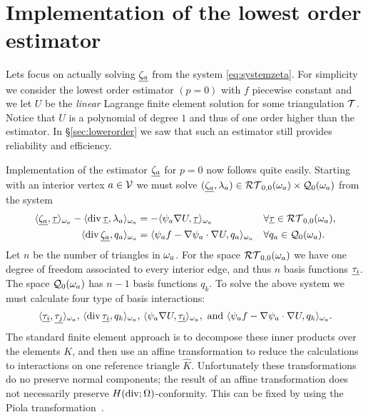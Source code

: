 \documentclass[thesis.tex]{subfiles}
\begin{document}
\section{Implementation of the lowest order estimator}
Lets focus on actually solving $\underline{\zeta_a}$ from the system \eqref{eq:systemzeta}. 
For simplicity we consider the lowest order estimator $(p=0)$ with $f$ piecewise constant and 
we let $U$ be the \emph{linear} Lagrange finite element solution for some triangulation $\mathcal{T}$. 
Notice that $U$ is a polynomial of degree $1$ and thus of one order higher than the estimator.
In \S\ref{sec:lowerorder} we saw that such an estimator still provides reliability and efficiency.


Implementation of the estimator $\underline{\zeta_a}$ for $p=0$ now follows quite easily. 
Starting with an interior vertex $a \in \mathcal{V}$ we must solve $(\underline{\zeta_a}, \lambda_a) \in \mathcal{RT}_{0,0}(\omega_a)\times \mathcal{Q}_0(\omega_a)$ from the system
\begin{equation}
  \label{eq:systemp0}
  \begin{alignedat}{3}
    \langle \underline{\zeta_a}, \underline{\tau} \rangle_{\omega_a} - \langle \operatorname{div} \underline{\tau}, {\lambda_a} \rangle_{\omega_a} &= - \langle \psi_a \nabla U, \underline{\tau} \rangle_{\omega_a} && \quad \forall \underline{\tau} \in \mathcal{RT}_{0,0}(\omega_a),\\
    \langle \operatorname{div} \underline{\zeta_a}, q_a \rangle_{\omega_a} &= \langle \psi_a f - \nabla \psi_a \cdot \nabla U, q_a \rangle_{\omega_a} && \quad \forall q_a \in \mathcal{Q}_0(\omega_a).
  \end{alignedat}
\end{equation}
  Let $n$ be the number of triangles in $\omega_a$.
  For the space $\mathcal{RT}_{0,0}(\omega_a)$ we have one degree of freedom associated to every interior edge, and thus $n$ basis functions $\underline{\tau_i}$. The space $\mathcal{Q}_0(\omega_a)$ has $n-1$ basis functions $q_k$.  To solve the above system we must calculate four type of basis interactions:
  \begin{equation}
    \label{eq:basinact}
    \langle \underline{\tau_i}, \underline{\tau_j} \rangle_{\omega_a}, \, \langle \operatorname{div} \underline{\tau_i}, q_k \rangle_{\omega_a}, \, \langle \psi_a \nabla U, \underline{\tau_i} \rangle_{\omega_a}, \text{ and } \langle \psi_a f - \nabla \psi_a \cdot \nabla U, q_k \rangle_{\omega_a}.
  \end{equation}
  The standard finite element approach is to decompose these inner products over the elements $K$, and then use an affine transformation
  to reduce the calculations to interactions on one reference triangle $\hat K$. Unfortunately these transformations do no preserve
  normal components; the result of an affine transformation does not necessarily preserve $H(\operatorname{div}; \Omega)$-conformity. This can be fixed 
  by using the Piola transformation~\cite[\S2.1.3]{brezzimixed}. 
  
\end{document}
